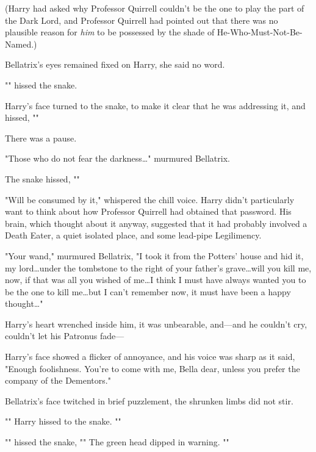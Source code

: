 (Harry had asked why Professor Quirrell couldn’t be the one to play the part of
the Dark Lord, and Professor Quirrell had pointed out that there was no
plausible reason for \emph{him} to be possessed by the shade of
He-Who-Must-Not-Be-Named.)

Bellatrix’s eyes remained fixed on Harry, she said no word.

"" hissed the snake.

Harry’s face turned to the snake, to make it clear that he was addressing it,
and hissed, ""

There was a pause.

"Those who do not fear the darkness…" murmured Bellatrix.

The snake hissed, ""

"Will be consumed by it," whispered the chill voice. Harry didn’t particularly
want to think about how Professor Quirrell had obtained that password. His brain,
which thought about it anyway, suggested that it had probably involved a Death
Eater, a quiet isolated place, and some lead-pipe Legilimency.

"Your wand," murmured Bellatrix, "I took it from the Potters’ house and hid it,
my lord…under the tombstone to the right of your father’s grave…will
you kill me, now, if that was all you wished of me…I think I must
have always wanted you to be the one to kill me…but I can’t remember
now, it must have been a happy thought…"

Harry’s heart wrenched inside him, it was unbearable, and—and he couldn’t
cry, couldn’t let his Patronus fade—

Harry’s face showed a flicker of annoyance, and his voice was sharp as it said,
"Enough foolishness. You’re to come with me, Bella dear, unless you prefer the
company of the Dementors."

Bellatrix’s face twitched in brief puzzlement, the shrunken limbs did not stir.

"" Harry hissed to the snake. ""

"" hissed the snake, "" The green head dipped in warning.
""

